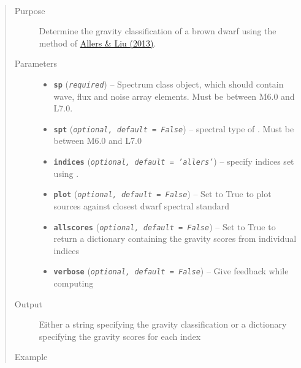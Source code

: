 \documentclass[letterpaper,10pt,english]{sphinxmanual}
\begin{document}
\begin{fulllineitems}
\label{api:splat.classifyGravity}~\begin{quote}\begin{description}
\item[{Purpose}] \leavevmode
Determine the gravity classification of a brown dwarf using the method of \href{http://adsabs.harvard.edu/abs/2013ApJ...772...79A}{Allers \& Liu (2013)}.

\item[{Parameters}] \leavevmode\begin{itemize}
\item {} 
\textbf{\texttt{sp}} (\emph{\texttt{required}}) -- Spectrum class object, which should contain wave, flux and
noise array elements. Must be between M6.0 and L7.0.

\item {} 
\textbf{\texttt{spt}} (\emph{\texttt{optional, default = False}}) -- spectral type of . Must be between M6.0 and L7.0

\item {} 
\textbf{\texttt{indices}} (\emph{\texttt{optional, default = 'allers'}}) -- specify indices set using .

\item {} 
\textbf{\texttt{plot}} (\emph{\texttt{optional, default = False}}) -- Set to True to plot sources against closest dwarf spectral standard

\item {} 
\textbf{\texttt{allscores}} (\emph{\texttt{optional, default = False}}) -- Set to True to return a dictionary containing the gravity scores from individual indices

\item {} 
\textbf{\texttt{verbose}} (\emph{\texttt{optional, default = False}}) -- Give feedback while computing

\end{itemize}

\item[{Output}] \leavevmode
Either a string specifying the gravity classification or a dictionary specifying the gravity scores for each index

\item[{Example}] \leavevmode
\end{description}\end{quote}


\end{fulllineitems}
\end{document}
